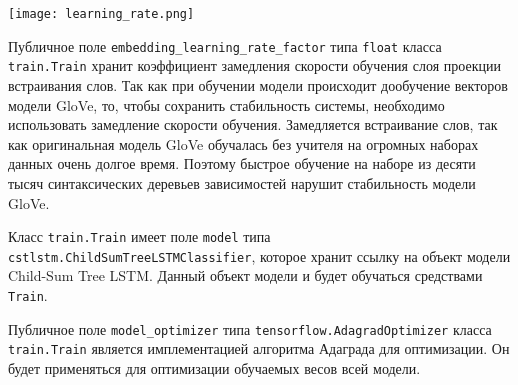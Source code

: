 \begin{center}
  \texttt{[image: learning\_rate.png]}
  \label{fig:func:learning_rate}
\end{center}

Публичное поле \texttt{embedding\_learning\_rate\_factor} типа \texttt{float} класса \texttt{train.Train} хранит коэффициент замедления скорости обучения слоя проекции встраивания слов. Так как при обучении модели происходит дообучение векторов модели GloVe, то, чтобы сохранить стабильность системы, необходимо использовать замедление скорости обучения. Замедляется встраивание слов, так как оригинальная модель GloVe обучалась без учителя на огромных наборах данных очень долгое время. Поэтому быстрое обучение на наборе из десяти тысяч синтаксических деревьев зависимостей нарушит стабильность модели GloVe.

Класс \texttt{train.Train} имеет поле \texttt{model} типа \texttt{cstlstm.Child\-Sum\-TreeLSTMClassifier}, которое хранит ссылку на объект модели Child-Sum Tree LSTM\@. Данный объект модели и будет обучаться средствами \texttt{Tra\-in}.

Публичное поле \texttt{model\_optimizer} типа \texttt{tensorflow.Adagrad\-Optimiz\-er} класса \texttt{train.Train} является имплементацией алгоритма Ад\-аграда для оптимизации. Он будет применяться для оптимизации обучаемых весов всей модели.

